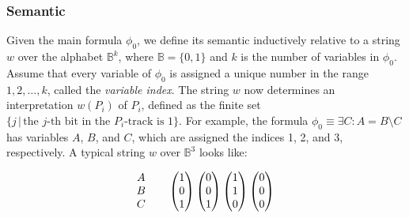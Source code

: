 \documentclass[pdflatex,sn-mathphys-num]{sn-jnl}%
\theoremstyle{thmstyleone}%
\theoremstyle{thmstyletwo}%
\theoremstyle{thmstylethree}%
\begin{document}
        \subsubsection*{Semantic}
            Given the main formula $\phi_0$, we define its semantic inductively relative to a string $w$ over the alphabet $\mathbb{B}^k$, where $\mathbb{B} = \{0, 1\}$ and $k$ is the number of variables in $\phi_0$. Assume that every variable of $\phi_0$ is assigned a unique number in the range $1, 2, \dots, k$, called the \textit{variable index}. The string $w$ now determines an interpretation $w(P_i)$ of $P_i$, defined as the finite set $\{j \,|\, \text{the } j\text{-th bit in the } P_i\text{-track is 1}\}$. For example, the formula $\phi_0 \equiv \exists C : A = B \setminus C$ has variables $A$, $B$, and $C$, which are assigned the indices 1, 2, and 3, respectively. A typical string $w$ over $\mathbb{B}^3$ looks like:

            $$
            \begin{matrix}
                A\\
                B\\
                C
            \end{matrix}
            \hspace*{2em}
            \begin{pmatrix}
                1\\
                0\\
                1
            \end{pmatrix}
            \begin{pmatrix}
                0\\
                0\\
                1
            \end{pmatrix}
            \begin{pmatrix}
                1\\
                1\\
                0
            \end{pmatrix}
            \begin{pmatrix}
                0\\
                0\\
                0\\
            \end{pmatrix}
            $$

            \vspace*{0.5em}
\end{document}
